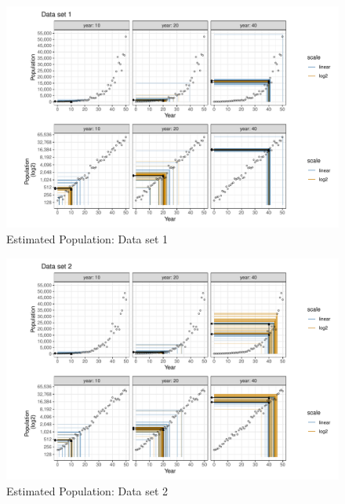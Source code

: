\documentclass[print]{nuthesis}
\begin{document}
\begin{figure}[tbp]

{\centering \includegraphics[width=1\linewidth,]{thesis_files/figure-latex/spaghetti-dataset1-1} 

}

\caption{Estimated Population: Data set 1}\label{fig:spaghetti-dataset1}
\end{figure}

\begin{figure}[tbp]

{\centering \includegraphics[width=1\linewidth,]{thesis_files/figure-latex/spaghetti-dataset2-1} 

}

\caption{Estimated Population: Data set 2}\label{fig:spaghetti-dataset2}
\end{figure}
\end{document}

